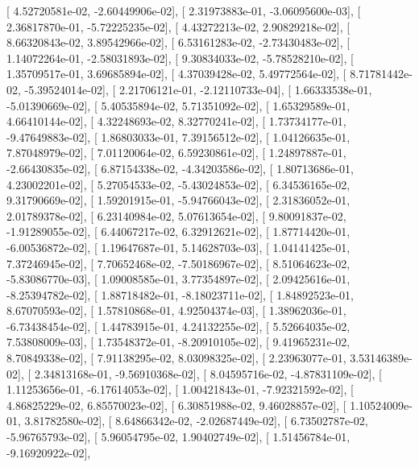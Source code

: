 \documentclass{article}
\begin{document}
       [  4.52720581e-02,  -2.60449906e-02],
       [  2.31973883e-01,  -3.06095600e-03],
       [  2.36817870e-01,  -5.72225235e-02],
       [  4.43272213e-02,   2.90829218e-02],
       [  8.66320843e-02,   3.89542966e-02],
       [  6.53161283e-02,  -2.73430483e-02],
       [  1.14072264e-01,  -2.58031893e-02],
       [  9.30834033e-02,  -5.78528210e-02],
       [  1.35709517e-01,   3.69685894e-02],
       [  4.37039428e-02,   5.49772564e-02],
       [  8.71781442e-02,  -5.39524014e-02],
       [  2.21706121e-01,  -2.12110733e-04],
       [  1.66333538e-01,  -5.01390669e-02],
       [  5.40535894e-02,   5.71351092e-02],
       [  1.65329589e-01,   4.66410144e-02],
       [  4.32248693e-02,   8.32770241e-02],
       [  1.73734177e-01,  -9.47649883e-02],
       [  1.86803033e-01,   7.39156512e-02],
       [  1.04126635e-01,   7.87048979e-02],
       [  7.01120064e-02,   6.59230861e-02],
       [  1.24897887e-01,  -2.66430835e-02],
       [  6.87154338e-02,  -4.34203586e-02],
       [  1.80713686e-01,   4.23002201e-02],
       [  5.27054533e-02,  -5.43024853e-02],
       [  6.34536165e-02,   9.31790669e-02],
       [  1.59201915e-01,  -5.94766043e-02],
       [  2.31836052e-01,   2.01789378e-02],
       [  6.23140984e-02,   5.07613654e-02],
       [  9.80091837e-02,  -1.91289055e-02],
       [  6.44067217e-02,   6.32912621e-02],
       [  1.87714420e-01,  -6.00536872e-02],
       [  1.19647687e-01,   5.14628703e-03],
       [  1.04141425e-01,   7.37246945e-02],
       [  7.70652468e-02,  -7.50186967e-02],
       [  8.51064623e-02,  -5.83086770e-03],
       [  1.09008585e-01,   3.77354897e-02],
       [  2.09425616e-01,  -8.25394782e-02],
       [  1.88718482e-01,  -8.18023711e-02],
       [  1.84892523e-01,   8.67070593e-02],
       [  1.57810868e-01,   4.92504374e-03],
       [  1.38962036e-01,  -6.73438454e-02],
       [  1.44783915e-01,   4.24132255e-02],
       [  5.52664035e-02,   7.53808009e-03],
       [  1.73548372e-01,  -8.20910105e-02],
       [  9.41965231e-02,   8.70849338e-02],
       [  7.91138295e-02,   8.03098325e-02],
       [  2.23963077e-01,   3.53146389e-02],
       [  2.34813168e-01,  -9.56910368e-02],
       [  8.04595716e-02,  -4.87831109e-02],
       [  1.11253656e-01,  -6.17614053e-02],
       [  1.00421843e-01,  -7.92321592e-02],
       [  4.86825229e-02,   6.85570023e-02],
       [  6.30851988e-02,   9.46028857e-02],
       [  1.10524009e-01,   3.81782580e-02],
       [  8.64866342e-02,  -2.02687449e-02],
       [  6.73502787e-02,  -5.96765793e-02],
       [  5.96054795e-02,   1.90402749e-02],
       [  1.51456784e-01,  -9.16920922e-02],
\end{document}
